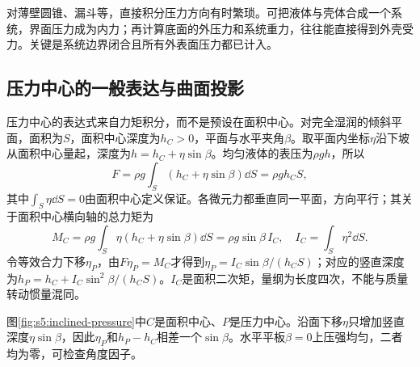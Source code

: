 对薄壁圆锥、漏斗等，直接积分压力方向有时繁琐。可把液体与壳体合成一个系统，界面压力成为内力；再计算底面的外压力和系统重力，往往能直接得到外壳受力。关键是系统边界闭合且所有外表面压力都已计入。

\subsection{压力中心的一般表达与曲面投影}
压力中心的表达式来自力矩积分，而不是预设在面积中心。对完全湿润的倾斜平面，面积为$S$，面积中心深度为$h_C>0$，平面与水平夹角$\beta$。取平面内坐标$\eta$沿下坡从面积中心量起，深度为$h=h_C+\eta\sin\beta$。均匀液体的表压为$\rho gh$，所以
\[
F=\rho g\int_S(h_C+\eta\sin\beta)\dd S
=\rho gh_CS,
\]
其中$\int_S\eta\dd S=0$由面积中心定义保证。各微元力都垂直同一平面，方向平行；其关于面积中心横向轴的总力矩为
\[
M_C=\rho g\int_S\eta(h_C+\eta\sin\beta)\dd S
=\rho g\sin\beta\,I_C,\quad I_C=\int_S\eta^2\dd S.
\]
令等效合力下移$\eta_P$，由$F\eta_P=M_C$才得到$\eta_P=I_C\sin\beta/(h_CS)$；对应的竖直深度为$h_P=h_C+I_C\sin^2\beta/(h_CS)$。$I_C$是面积二次矩，量纲为长度四次，不能与质量转动惯量混同。

图\ref{fig:s5:inclined-pressure}中$C$是面积中心、$P$是压力中心。沿面下移$\eta$只增加竖直深度$\eta\sin\beta$，因此$\eta_P$和$h_P-h_C$相差一个$\sin\beta$。水平平板$\beta=0$上压强均匀，二者均为零，可检查角度因子。


